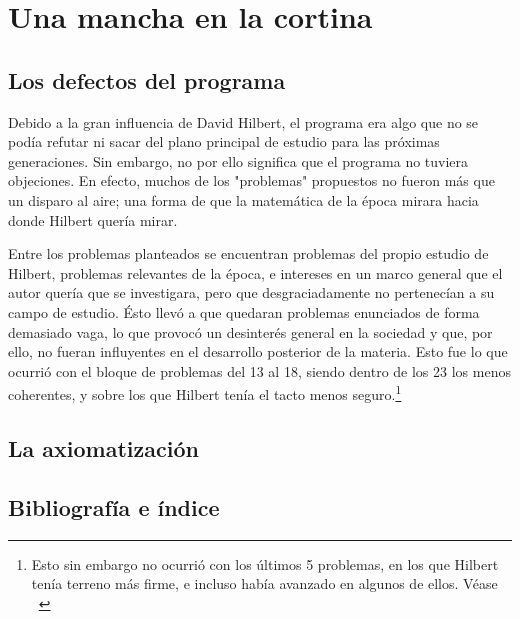 \chapter{Una mancha en la cortina} \label{ch:Hilbert-2}

\section{Los defectos del programa}

Debido a la gran influencia de David Hilbert, el programa era algo que no se podía refutar ni sacar del plano principal de estudio para las próximas generaciones. Sin embargo,
no por ello significa que el programa no tuviera objeciones. En efecto, muchos de los "problemas" propuestos no fueron más que un disparo al aire; una forma de que la matemática 
de la época mirara hacia donde Hilbert quería mirar. 

Entre los problemas planteados se encuentran problemas del propio estudio de Hilbert, problemas relevantes de la época, e intereses en un marco general que el autor quería que se
investigara, pero que desgraciadamente no pertenecían a su campo de estudio. Ésto llevó a que quedaran problemas enunciados de forma demasiado vaga, lo que provocó un desinterés 
general en la sociedad y que, por ello, no fueran influyentes en el desarrollo posterior de la materia. Esto fue lo que ocurrió con el bloque de problemas del 13 al 18, siendo dentro
de los 23 los menos coherentes, y sobre los que Hilbert tenía el tacto menos seguro.\footnote{Esto sin embargo no ocurrió con los últimos 5 problemas, en los que Hilbert tenía terreno
más firme, e incluso había avanzado en algunos de ellos. Véase ~\cite[Pág. 85]{BREZIS199876}}  


\section{La axiomatización}




\section{Bibliografía e índice}

\cite{Zach_2007,Fer_Castro_2020,gray2000hilbert,stewart1987problems,gray2003reto,alma991014322964704990}



\endinput
